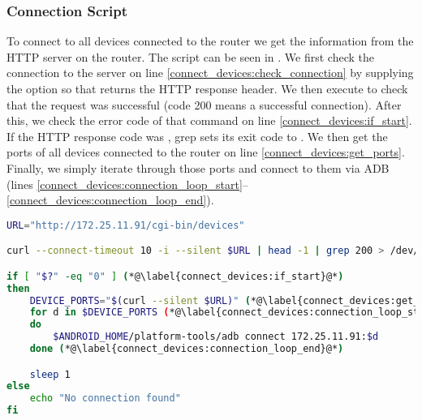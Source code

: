 \subsubsection{Connection Script}
To connect to all devices connected to the router we get the information from the HTTP server on the router. The script can be seen in . We first check the connection to the server on line \ref{connect_devices:check_connection} by supplying the  option so that  returns the HTTP response header. We then execute  to check that the request was successful (code 200 means a successful connection). After this, we check the error code of that command on line \ref{connect_devices:if_start}. If the HTTP response code was , grep sets its exit code to . We then get the ports of all devices connected to the router on line \ref{connect_devices:get_ports}. Finally, we simply iterate through those ports and connect to them via ADB (lines \ref{connect_devices:connection_loop_start}--\ref{connect_devices:connection_loop_end}).

  \begin{lstlisting}[language=bash,caption=Script that connects to devices,label=lst:connect_devices]
URL="http://172.25.11.91/cgi-bin/devices"

curl --connect-timeout 10 -i --silent $URL | head -1 | grep 200 > /dev/null (*@\label{connect_devices:check_connection}@*)

if [ "$?" -eq "0" ] (*@\label{connect_devices:if_start}@*)
then
    DEVICE_PORTS="$(curl --silent $URL)" (*@\label{connect_devices:get_ports}@*)
    for d in $DEVICE_PORTS (*@\label{connect_devices:connection_loop_start}@*)
    do
        $ANDROID_HOME/platform-tools/adb connect 172.25.11.91:$d
    done (*@\label{connect_devices:connection_loop_end}@*)

    sleep 1
else
    echo "No connection found"
fi
  \end{lstlisting}
